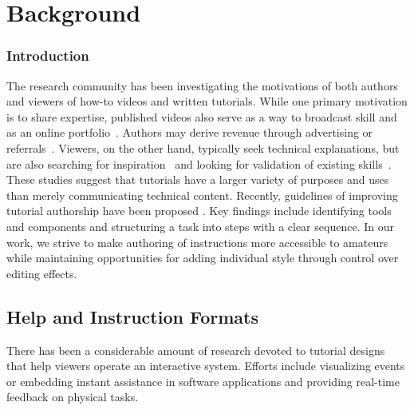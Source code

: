 

\chapter{Background}

\subsection{Introduction}

The research community has been investigating the motivations of both authors and viewers of how-to videos and written tutorials. While one primary motivation is to share expertise, published videos also serve as a way to broadcast skill and as an online portfolio~\cite{Torrey:2007he,Kuznetsov:2010:REA:1868914.1868950}. Authors may derive revenue through advertising or referrals~\cite{Lafreniere:2012tl}. Viewers, on the other hand, typically seek technical explanations, but are also searching for inspiration~\cite{Torrey:2009fc} and looking for validation of existing skills~\cite{Lafreniere:2012tl}.
%
These studies suggest that tutorials have a larger variety of purposes and uses than merely communicating technical content. Recently, guidelines of improving tutorial authorship have been proposed \cite{Wakkary:2015:TAH:2702123.2702550}. Key findings include identifying tools and components and structuring a task into steps with a clear sequence. In our work, we strive to make authoring of instructions more accessible to amateurs while maintaining opportunities for adding individual style through control over editing effects.


\section{Help and Instruction Formats}
There has been a considerable amount of research devoted to tutorial designs that help viewers operate an interactive system. Efforts include visualizing events or embedding instant assistance in software applications and providing real-time feedback on physical tasks.

